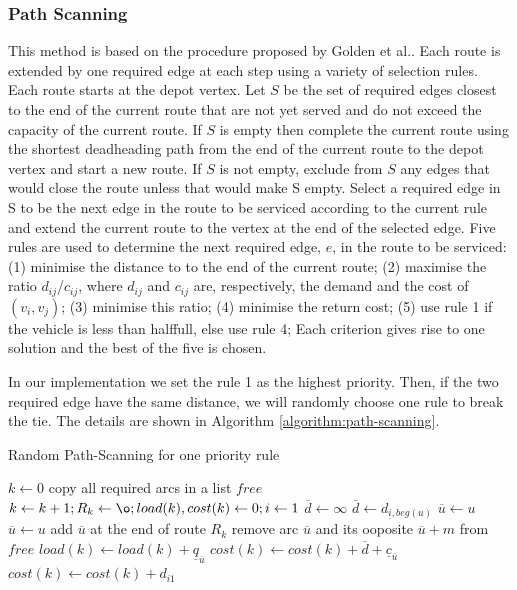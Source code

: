 \documentclass[journal,twoside,web]{ieeecolor}
\begin{document}
\subsubsection{Path Scanning}
This method is based on the procedure proposed by Golden et al.\cite{Golden1983}. Each route is extended by one required edge at each step using a variety of selection rules. Each route starts at the depot vertex. Let $S$ be the set of required edges closest to the end of the current route that are not yet served and do not exceed the capacity of the current route. If $S$ is empty then complete the current route using the shortest deadheading path from the end of the current route to the depot vertex and start a new route. If $S$ is not empty, exclude from $S$ any edges that would close the route unless that would make S empty. Select a required edge in S to be the next edge in the route to be serviced according to the current rule and extend the current route to the vertex at the end of the selected edge. Five rules are used to determine the next required edge, $e$, in the route to be serviced: (1) minimise the distance to to the end of the current route; (2) maximise the ratio $d_{ij}$/$c_{ij}$, where $d_{ij}$ and $c_{ij}$ are, respectively, the demand and the cost of $(v_i ,v_j)$; (3) minimise this ratio; (4) minimise the return cost; (5) use rule 1 if the vehicle is less than halffull, else use rule 4;  Each criterion gives rise to one solution and the best of the five is chosen.
\par
In our implementation we set the rule 1 as the highest priority. Then, if the two required edge have the same distance, we will randomly choose one rule to break the tie. The details are shown in Algorithm \ref{algorithm:path-scanning}.
\begin{algorithm}
\caption{Random Path-Scanning for one priority rule}
\label{algorithm:path-scanning}
\begin{algorithmic} [1]
\STATE $k \leftarrow 0$
\STATE copy all required arcs in a list $free$
\REPEAT
\STATE $k\leftarrow k+1; R_k \leftarrow \o; load(k), cost(k)\leftarrow 0; i\leftarrow 1$
\REPEAT
\STATE $\overline{d} \leftarrow \infty$
\STATE $\overline{d} \leftarrow d_{\underline{i},beg(u)}$
\STATE $\overline{u} \leftarrow u$
\STATE $\overline{u} \leftarrow u$
\ENDIF
\ENDFOR
\STATE add $\overline{u}$ at the end of route $R_k$
\STATE remove arc $\overline{u}$ and its ooposite $\overline{u}+m$ from $free$
\STATE $load(k)\leftarrow load(k)+\underline{q}_{\overline{u}}$
\STATE $cost(k)\leftarrow cost(k) + \overline{d} + \underline{c}_{\overline{u}}$
\STATE $cost(k) \leftarrow cost(k) + d_{i1}$
\end{algorithmic}
\end{algorithm}
\end{document}
